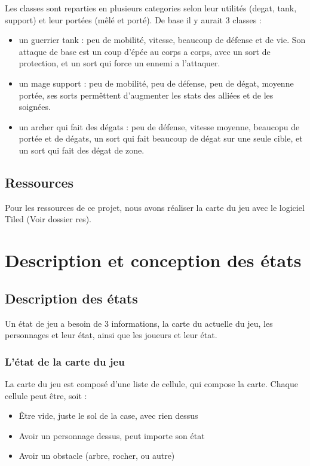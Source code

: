 \documentclass[a4paper,12pt]{article}
\begin{document}
Les classes sont reparties en plusieurs categories selon leur utilités (degat, tank, support) et leur portées (mêlé et porté).
De base il y aurait 3 classes : 

\begin{itemize}
    \item un guerrier tank : peu de mobilité, vitesse, beaucoup de défense et de vie. Son attaque de base est un coup d'épée au corps a corps, avec un sort de protection, et un sort qui force un ennemi a l'attaquer.
    \item un mage support : peu de mobilité, peu de défense, peu de dégat, moyenne portée, ses sorts permêttent d'augmenter les stats des alliées et de les soignées.
    \item un archer qui fait des dégats : peu de défense, vitesse moyenne, beaucopu de portée et de dégats, un sort qui fait beaucoup de dégat sur une seule cible, et un sort qui fait des dégat de zone.
\end{itemize}

\subsection{Ressources}

Pour les ressources de ce projet, nous avons réaliser la carte du jeu avec le logiciel Tiled 
(Voir dossier res).


\clearpage
\section{Description et conception des états}

\subsection{Description des états}

Un état de jeu a besoin de 3 informations, la carte du actuelle du jeu,
les personnages et leur état, ainsi que les joueurs et leur état.

\subsubsection{L'état de la carte du jeu}

La carte du jeu est composé d'une liste de cellule, qui compose la carte.
Chaque cellule peut être, soit :
\begin{itemize}
  \item Être vide, juste le sol de la case, avec rien dessus
  \item Avoir un personnage dessus, peut importe son état
  \item Avoir un obstacle (arbre, rocher, ou autre)
\end{itemize}
\end{document}
